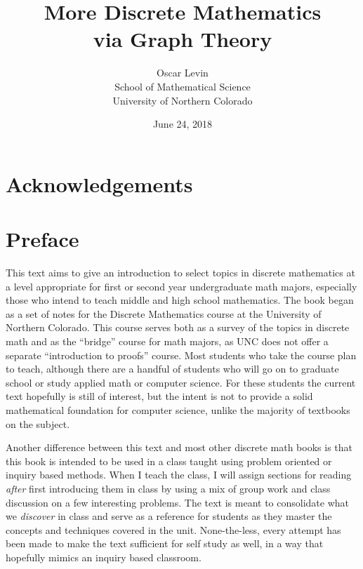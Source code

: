 \documentclass[10pt,]{book}
\title{More Discrete Mathematics\\
{\large via Graph Theory}}
\author{Oscar Levin\\
School of Mathematical Science\\
University of Northern Colorado
}
\date{June 24, 2018}
\theoremstyle{plain}
\theoremstyle{definition}
\theoremstyle{definition}
\theoremstyle{definition}
\numberwithin{equation}{chapter}
\begin{document}
\frontmatter


\chapter*{Acknowledgements}\label{acknowledgement-1}
\chapter*{Preface}\label{preface}
\hypertarget{p-1}{}%
This text aims to give an introduction to select topics in discrete mathematics at a level appropriate for first or second year undergraduate math majors, especially those who intend to teach middle and high school mathematics. The book began as a set of notes for the Discrete Mathematics course at the University of Northern Colorado. This course serves both as a survey of the topics in discrete math and as the ``bridge'' course for math majors, as UNC does not offer a separate ``introduction to proofs'' course. Most students who take the course plan to teach, although there are a handful of students who will go on to graduate school or study applied math or computer science. For these students the current text hopefully is still of interest, but the intent is not to provide a solid mathematical foundation for computer science, unlike the majority of textbooks on the subject.%
\par
\hypertarget{p-2}{}%
Another difference between this text and most other discrete math books is that this book is intended to be used in a class taught using problem oriented or inquiry based methods. When I teach the class, I will assign sections for reading \emph{after} first introducing them in class by using a mix of group work and class discussion on a few interesting problems. The text is meant to consolidate what we \emph{discover} in class and serve as a reference for students as they master the concepts and techniques covered in the unit. None-the-less, every attempt has been made to make the text sufficient for self study as well, in a way that hopefully mimics an inquiry based classroom.%
\par
\hypertarget{p-3}{}%
\end{document}
